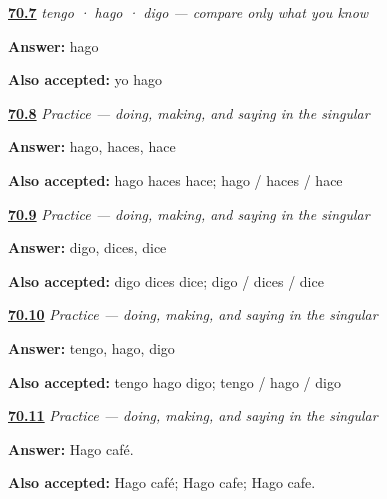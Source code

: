 \noindent\begin{minipage}[t]{\linewidth}
\raggedright
\hyperlink{review-ES-C12-yo-go-hacer-choice}{\textbf{70.7}} \emph{tengo · hago · digo — compare only what you know}\par
\small \textbf{Answer:} hago\par
\footnotesize \textbf{Also accepted:} yo hago
\end{minipage}\par\medskip

\noindent\begin{minipage}[t]{\linewidth}
\raggedright
\hyperlink{review-ES-C12-practice-hacer-forms}{\textbf{70.8}} \emph{Practice — doing, making, and saying in the singular}\par
\small \textbf{Answer:} hago, haces, hace\par
\footnotesize \textbf{Also accepted:} hago haces hace; hago / haces / hace
\end{minipage}\par\medskip

\noindent\begin{minipage}[t]{\linewidth}
\raggedright
\hyperlink{review-ES-C12-practice-decir-forms}{\textbf{70.9}} \emph{Practice — doing, making, and saying in the singular}\par
\small \textbf{Answer:} digo, dices, dice\par
\footnotesize \textbf{Also accepted:} digo dices dice; digo / dices / dice
\end{minipage}\par\medskip

\noindent\begin{minipage}[t]{\linewidth}
\raggedright
\hyperlink{review-ES-C12-practice-yo-go-order}{\textbf{70.10}} \emph{Practice — doing, making, and saying in the singular}\par
\small \textbf{Answer:} tengo, hago, digo\par
\footnotesize \textbf{Also accepted:} tengo hago digo; tengo / hago / digo
\end{minipage}\par\medskip

\noindent\begin{minipage}[t]{\linewidth}
\raggedright
\hyperlink{review-ES-C12-practice-make-coffee}{\textbf{70.11}} \emph{Practice — doing, making, and saying in the singular}\par
\small \textbf{Answer:} Hago café.\par
\footnotesize \textbf{Also accepted:} Hago café; Hago cafe; Hago cafe.
\end{minipage}\par\medskip

